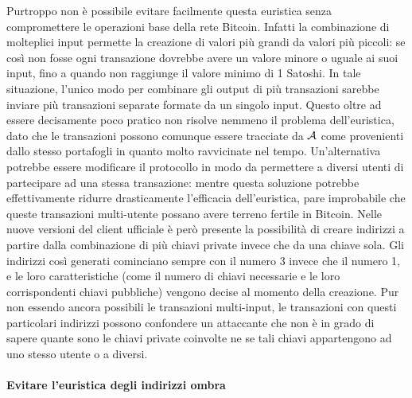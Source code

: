 Purtroppo non è possibile evitare facilmente questa euristica senza compromettere le operazioni base della rete Bitcoin.
Infatti la combinazione di molteplici input permette la creazione di valori più grandi da valori più piccoli: se così non fosse ogni transazione dovrebbe avere un valore minore o uguale ai suoi input, fino a quando non raggiunge il valore minimo di 1 Satoshi. In tale situazione, l'unico modo per combinare gli output di più transazioni sarebbe inviare più transazioni separate formate da un singolo input. Questo oltre ad essere decisamente poco pratico non risolve nemmeno il problema dell'euristica, dato che le transazioni possono comunque essere tracciate da $\mathcal{A}$ come provenienti dallo stesso portafogli in quanto molto ravvicinate nel tempo.
Un'alternativa potrebbe essere modificare il protocollo in modo da permettere a diversi utenti di partecipare ad una stessa transazione: mentre questa soluzione potrebbe effettivamente ridurre drasticamente l'efficacia dell'euristica, pare improbabile che queste transazioni multi-utente possano avere terreno fertile in Bitcoin.
Nelle nuove versioni del client ufficiale è però presente la possibilità di creare indirizzi a partire dalla combinazione di più chiavi private invece che da una chiave sola. Gli indirizzi così generati cominciano sempre con il numero 3 invece che il numero 1, e le loro caratteristiche (come il numero di chiavi necessarie e le loro corrispondenti chiavi pubbliche) vengono decise al momento della creazione. Pur non essendo ancora possibili le transazioni multi-input, le transazioni con questi particolari indirizzi possono confondere un attaccante che non è in grado di sapere quante sono le chiavi private coinvolte ne se tali chiavi appartengono ad uno stesso utente o a diversi.

\paragraph{Evitare l'euristica degli indirizzi ombra}

